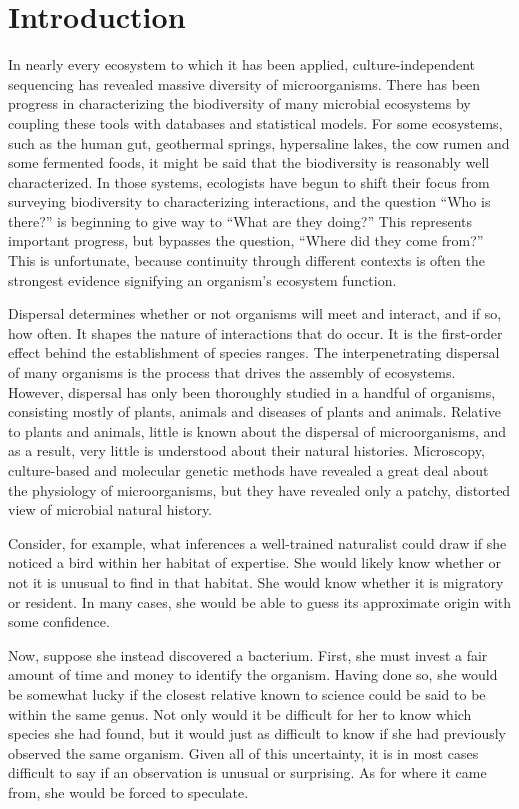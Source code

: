 \section{Introduction}

In nearly every ecosystem to which it has been applied, culture-independent sequencing has revealed massive diversity of microorganisms. There has been progress in characterizing the biodiversity of many microbial ecosystems by coupling these tools with databases and statistical models. For some ecosystems, such as the human gut, geothermal springs, hypersaline lakes, the cow rumen and some fermented foods, it might be said that the biodiversity is reasonably well characterized. In those systems, ecologists have begun to shift their focus from surveying biodiversity to characterizing interactions, and the question ``Who is there?'' is beginning to give way to ``What are they doing?'' This represents important progress, but bypasses the question, ``Where did they come from?'' This is unfortunate, because continuity through different contexts is often the strongest evidence signifying an organism's ecosystem function.

Dispersal determines whether or not organisms will meet and interact, and if so, how often. It shapes the nature of interactions that do occur. It is the first-order effect behind the establishment of species ranges. The interpenetrating dispersal of many organisms is the process that drives the assembly of ecosystems. However, dispersal has only been thoroughly studied in a handful of organisms, consisting mostly of plants, animals and diseases of plants and animals. Relative to plants and animals, little is known about the dispersal of microorganisms, and as a result, very little is understood about their natural histories. Microscopy, culture-based and molecular genetic methods have revealed a great deal about the physiology of microorganisms, but they have revealed only a patchy, distorted view of microbial natural history.

Consider, for example, what inferences a well-trained naturalist could draw if she noticed a bird within her habitat of expertise. She would likely know whether or not it is unusual to find in that habitat. She would know whether it is migratory or resident. In many cases, she would be able to guess its approximate origin with some confidence. 

Now, suppose she instead discovered a bacterium. First, she must invest a fair amount of time and money to identify the organism. Having done so, she would be somewhat lucky if the closest relative known to science could be said to be within the same genus. Not only would it be difficult for her to know which species she had found, but it would just as difficult to know if she had previously observed the same organism. Given all of this uncertainty, it is in most cases difficult to say if an observation is unusual or surprising. As for where it came from, she would be forced to speculate.

